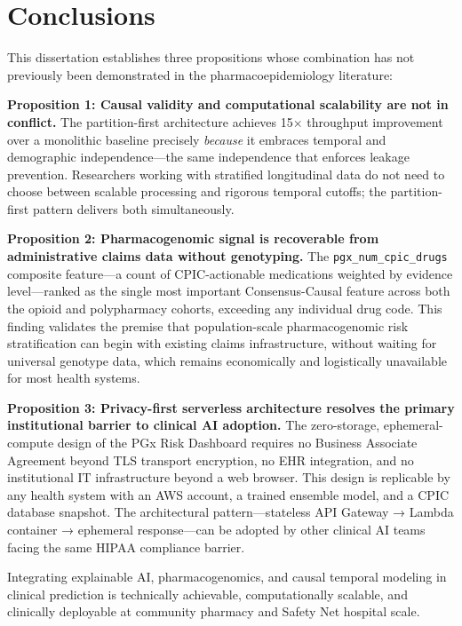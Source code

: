 \documentclass[
  12pt,
]{book}
\begin{document}
\chapter{Conclusions}\label{sec-conclusions}

This dissertation establishes three propositions whose combination has
not previously been demonstrated in the pharmacoepidemiology literature:

\textbf{Proposition 1: Causal validity and computational scalability are
not in conflict.} The partition-first architecture achieves 15\(\times\)
throughput improvement over a monolithic baseline precisely
\emph{because} it embraces temporal and demographic independence---the
same independence that enforces leakage prevention. Researchers working
with stratified longitudinal data do not need to choose between scalable
processing and rigorous temporal cutoffs; the partition-first pattern
delivers both simultaneously.

\textbf{Proposition 2: Pharmacogenomic signal is recoverable from
administrative claims data without genotyping.} The
\texttt{pgx\_num\_cpic\_drugs} composite feature---a count of
CPIC-actionable medications weighted by evidence level---ranked as the
single most important Consensus-Causal feature across both the opioid
and polypharmacy cohorts, exceeding any individual drug code. This
finding validates the premise that population-scale pharmacogenomic risk
stratification can begin with existing claims infrastructure, without
waiting for universal genotype data, which remains economically and
logistically unavailable for most health systems.

\textbf{Proposition 3: Privacy-first serverless architecture resolves
the primary institutional barrier to clinical AI adoption.} The
zero-storage, ephemeral-compute design of the PGx Risk Dashboard
requires no Business Associate Agreement beyond TLS transport
encryption, no EHR integration, and no institutional IT infrastructure
beyond a web browser. This design is replicable by any health system
with an AWS account, a trained ensemble model, and a CPIC database
snapshot. The architectural pattern---stateless API Gateway → Lambda
container → ephemeral response---can be adopted by other clinical AI
teams facing the same HIPAA compliance barrier.

Integrating explainable AI, pharmacogenomics, and causal temporal
modeling in clinical prediction is technically achievable,
computationally scalable, and clinically deployable at community
pharmacy and Safety Net hospital scale.
\end{document}
